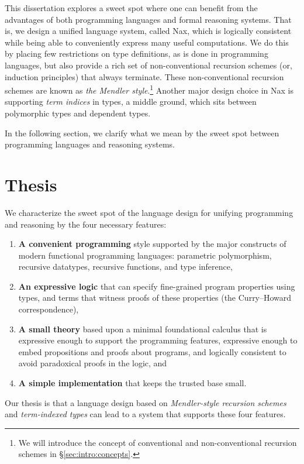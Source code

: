 This dissertation explores a sweet spot where one can benefit from
the advantages of both programming languages and formal reasoning systems.
That is, we design a unified language system, called Nax, which is
logically consistent while being able to conveniently express
many useful computations. We do this by placing few restrictions
on type definitions, as is done in programming languages, but also
provide a rich set of non-conventional recursion schemes
(or, induction principles) that always terminate.
These non-conventional recursion schemes are known as
\emph{the Mendler style}.\footnote{We will introduce
	the concept of conventional and non-conventional recursion schemes
	in \S\ref{sec:intro:concepts}.}
Another major design choice in Nax is supporting \emph{term indices} in types,
a middle ground, which sits between polymorphic types and dependent types.

In the following section, we clarify what we mean by the sweet spot between
programming languages and reasoning systems.

\section{Thesis}\label{sec:intro:thesis}
We characterize the sweet spot of the language design for unifying
programming and reasoning by the four necessary features:
\begin{enumerate}[(1)]
 \item \textbf{A convenient programming} style
         supported by the major constructs of
         modern functional programming languages: 
         parametric polymorphism, recursive datatypes,
         recursive functions, and type inference,

 \item \textbf{An expressive logic} that can specify
	 fine-grained program properties using types,
	 and terms that witness proofs of these properties 
         (the Curry--Howard correspondence),

 \item \textbf{A small theory} based upon a minimal foundational calculus
	 that is expressive enough to support the programming features,
	 expressive enough to embed propositions and proofs about programs,
	 and logically consistent to avoid paradoxical proofs in the logic, and

 \item \textbf{A simple implementation} that keeps the trusted base small.
\end{enumerate}
Our thesis is
that a language design based on \emph{Mendler-style recursion schemes}
and \emph{term-indexed types} can lead to a system that supports these four
features.

